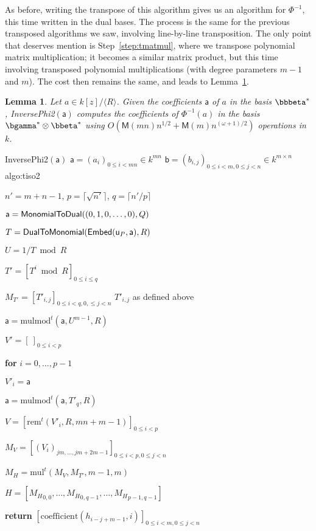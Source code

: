 \documentclass{sig-alternate}
\def\M {\ensuremath{\mathsf{M}}}
\def\va {\ensuremath{\mathsf{a}}}
\def\vy {\ensuremath{\mathsf{a}}}
\def\vu {\ensuremath{\mathsf{u}}}
\def\vb {\ensuremath{\mathsf{b}}}
\def\mul {\ensuremath{\mathrm{mul}}}
\def\rem {\ensuremath{\mathrm{rem}}}
\def\coeff {\ensuremath{\mathrm{coefficient}}}
\def\mulmod {\ensuremath{\mathrm{mulmod}}}
\newcounter{algo}
\newenvironment{algorithm_endline}[4]{\small\begin{center}\begin{minipage}{0.48\textwidth}
      \refstepcounter{algo}
      \label{#4}
      \sf
      \rule{\textwidth}{0.2pt}\\
      \makebox[\textwidth][c]{Algorithm~\arabic{algo}:~\textbf{#1}}\\
      \rule[0.5\baselineskip]{\textwidth}{0.2pt}\\

      \vspace{-12pt}

      \parbox{\textwidth}{\textbf{Input} #2}
      \parbox{\textwidth}{\textbf{Output} #3}

\vspace{-7pt}

      \begin{enumerate*}}{\end{enumerate*}
      \vspace{-11pt}
      \rule{\textwidth}{0.2pt}
\end{minipage}\end{center}
}
\newcommand{\ang}[1]{\langle#1\rangle}
\newtheorem{Lemma}{Lemma}
\begin{document}
As before, writing the transpose of this algorithm gives us an
algorithm for $\Phi^{-1}$, this time written in the dual bases.  The
process is the same for the previous transposed algorithms we saw,
involving line-by-line transposition. The only point that deserves
mention is Step~\ref{step:tmatmul}, where we transpose polynomial
matrix multiplication; it becomes a similar matrix product, but this
time involving transposed polynomial multiplications (with degree
parameters $m-1$ and $m$). The cost then remains the same, and leads to
Lemma~\ref{lemma:tiso2}.

\begin{Lemma}\label{lemma:tiso2}
  Let $a\in k[z]/\ang{R}$. Given the coefficients $\va$ of $a$ in the
  basis $\bbbeta^\ast$, {\sf InversePhi2}$(\va)$ computes the
  coefficients of $\Phi^{-1}(a)$ in the basis $\bgamma^\ast \otimes
  \bbeta^\ast$ using $O(\M(mn)n^{1/2}+\M(m) n^{(\omega+1)/2} )$
  operations in~$k$.
\end{Lemma}

\begin{algofloat}
  \begin{algorithm_endline}
{InversePhi2$(\va)$}
{$\va = (a_{i})_{0 \le i < mn} \in k^{m n}$}
{$\vb = (b_{i,j})_{0 \le i < m, 0 \le j < n} \in k^{m \times n}$}
{algo:tiso2}
\item $n'=m+n-1$, $p=\lceil \sqrt {n'} \rceil$, $q=\lceil n'/p\rceil$
\item $\vy={\sf MonomialToDual}((0,1,0,\dots,0),Q)$ 
\item $T={\sf DualToMonomial}({\sf Embed}(\vu_P, \vy), R)$
\item $U=1/T \bmod R$
\item $T'=[T^i \bmod R]_{0 \le i \le q}$
\item $M_{T'}=[T'_{i,j}]_{0\le i < q, 0, \le j < n}$ \hfill $T'_{i,j}$ as defined above
\item $\va = \mulmod^t(\va, U^{m-1}, R)$
\item $V'=[\ ]_{0 \le i < p}$
\item {\bf for} {$i=0,\dots,p-1$}
\item \hspace{7mm} $V'_i = \va$
\item \hspace{7mm} $\va = \mulmod^t(\va,T'_q,R)$
\item $V = [\rem^t(V'_i,R,mn+m-1)]_{0 \le i < p}$
\item $M_V = [(V_{i})_{jm,\dots,jm+2m-1}]_{0 \le i < p, 0 \le j < n}$
\item\label{step:tmatmul} $M_H = \mul^t(M_V, M_{T'},m-1,m)$
\item $H=[{M_H}_{0,0},\dots,{M_H}_{0,q-1},\dots,{M_H}_{p-1,q-1}]$
\item {\bf return} $[\coeff(h_{i-j+m-1},i)]_{0 \le i < m, 0 \le j < n}$
  \end{algorithm_endline}
\vspace{-5ex}
\end{algofloat}
\end{document}
